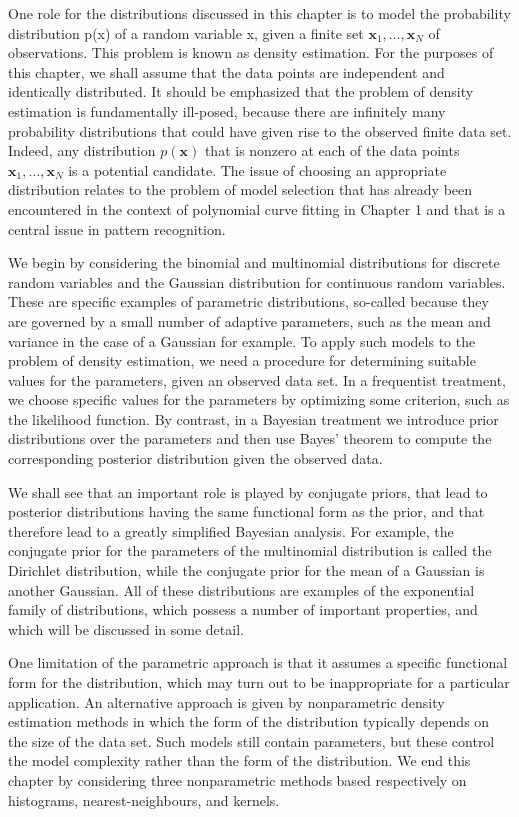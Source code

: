 \documentclass[
  10
]{article}
\begin{document}
One role for the distributions discussed in this chapter is to model the
probability distribution p(x) of a random variable x, given a finite set
\(\mathbf { x } _ { 1 } , \ldots , \mathbf { x } _ { N }\) of
observations. This problem is known as density estimation. For the
purposes of this chapter, we shall assume that the data points are
independent and identically distributed. It should be emphasized that
the problem of density estimation is fundamentally ill-posed, because
there are infinitely many probability distributions that could have
given rise to the observed finite data set. Indeed, any distribution
\(p ( \mathbf { x } )\) that is nonzero at each of the data points
\(\mathbf { x } _ { 1 } , \ldots , \mathbf { x } _ { N }\) is a
potential candidate. The issue of choosing an appropriate distribution
relates to the problem of model selection that has already been
encountered in the context of polynomial curve fitting in Chapter 1 and
that is a central issue in pattern recognition.

We begin by considering the binomial and multinomial distributions for
discrete random variables and the Gaussian distribution for continuous
random variables. These are specific examples of parametric
distributions, so-called because they are governed by a small number of
adaptive parameters, such as the mean and variance in the case of a
Gaussian for example. To apply such models to the problem of density
estimation, we need a procedure for determining suitable values for the
parameters, given an observed data set. In a frequentist treatment, we
choose specific values for the parameters by optimizing some criterion,
such as the likelihood function. By contrast, in a Bayesian treatment we
introduce prior distributions over the parameters and then use Bayes'
theorem to compute the corresponding posterior distribution given the
observed data.

We shall see that an important role is played by conjugate priors, that
lead to posterior distributions having the same functional form as the
prior, and that therefore lead to a greatly simplified Bayesian
analysis. For example, the conjugate prior for the parameters of the
multinomial distribution is called the Dirichlet distribution, while the
conjugate prior for the mean of a Gaussian is another Gaussian. All of
these distributions are examples of the exponential family of
distributions, which possess a number of important properties, and which
will be discussed in some detail.

One limitation of the parametric approach is that it assumes a specific
functional form for the distribution, which may turn out to be
inappropriate for a particular application. An alternative approach is
given by nonparametric density estimation methods in which the form of
the distribution typically depends on the size of the data set. Such
models still contain parameters, but these control the model complexity
rather than the form of the distribution. We end this chapter by
considering three nonparametric methods based respectively on
histograms, nearest-neighbours, and kernels.
\end{document}
